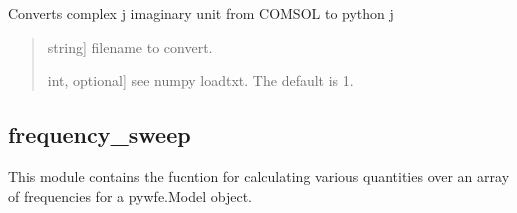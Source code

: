 \documentclass[letterpaper,10pt,english]{sphinxmanual}
\begin{document}
\begin{fulllineitems}
\label{\detokenize{utils:pywfe.utils.comsol_loader.comsol_i2j}}
\pysigstartsignatures
{}
\pysigstopsignatures
\sphinxAtStartPar
Converts complex \textquotesingle{}j\textquotesingle{} imaginary unit from COMSOL to python \textquotesingle{}j\textquotesingle{}
\begin{quote}\begin{description}
\begin{description}
\sphinxlineitem{\sphinxstylestrong{filename}}{[}string{]}
\sphinxAtStartPar
filename to convert.

\sphinxlineitem{\sphinxstylestrong{skiprows}}{[}int, optional{]}
\sphinxAtStartPar
see numpy loadtxt. The default is 1.

\end{description}

\begin{description}
\end{description}

\end{description}\end{quote}

\end{fulllineitems}

\label{\detokenize{utils:module-pywfe.utils.frequency_sweep}}

\subsection{frequency\_sweep}
\label{\detokenize{utils:frequency-sweep}}
\sphinxAtStartPar
This module contains the  fucntion for calculating various quantities over
an array of frequencies for a pywfe.Model object.
\end{document}
